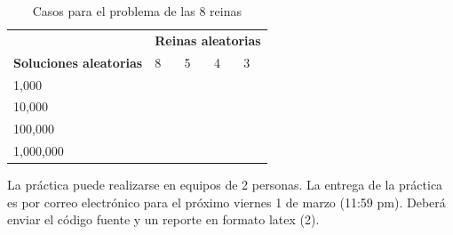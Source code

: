 \documentclass[runningheads,a4paper]{llncs}
\begin{document}
\begin{table}[!ht]
\centering
\label{tbl:reinas}
\caption{Casos para el problema de las 8 reinas}
\begin{tabular}{l|llll}
\hline
                                & \multicolumn{4}{l}{\textbf{Reinas aleatorias}}                                                \\
\textbf{Soluciones aleatorias}  & 8                     & 5                     & 4                     & 3                     \\ \hline
\multicolumn{1}{|l|}{1,000}     & \multicolumn{1}{l|}{} & \multicolumn{1}{l|}{} & \multicolumn{1}{l|}{} & \multicolumn{1}{l|}{} \\ \hline
\multicolumn{1}{|l|}{10,000}    & \multicolumn{1}{l|}{} & \multicolumn{1}{l|}{} & \multicolumn{1}{l|}{} & \multicolumn{1}{l|}{} \\ \hline
\multicolumn{1}{|l|}{100,000}   & \multicolumn{1}{l|}{} & \multicolumn{1}{l|}{} & \multicolumn{1}{l|}{} & \multicolumn{1}{l|}{} \\ \hline
\multicolumn{1}{|l|}{1,000,000} & \multicolumn{1}{l|}{} & \multicolumn{1}{l|}{} & \multicolumn{1}{l|}{} & \multicolumn{1}{l|}{} \\ \hline
\end{tabular}
\end{table}

La pr\'actica puede realizarse en equipos de 2 personas.
La entrega de la pr\'actica es por correo electr\'onico para el pr\'oximo viernes 1 de marzo (11:59 pm). Deber\'a enviar el c\'odigo fuente y un reporte en formato latex (2).




\cite{Marler04}
\cite{Deb08}
\cite{Miettinen98}
\cite{Zhang07}



\end{document}
